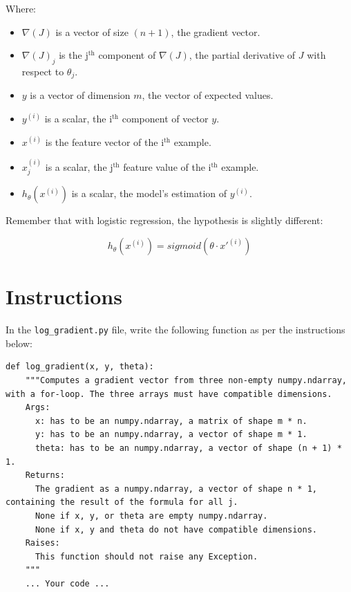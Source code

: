 \documentclass{42-en}
\begin{document}
Where:
\begin{itemize}
  \item $\nabla(J)$ is a vector of size $(n + 1)$, the gradient vector.
  \item $\nabla(J)_j$ is the j$^\text{th}$ component of $\nabla(J)$, the partial derivative of $J$ with respect to $\theta_j$.
  \item $y$ is a vector of dimension $m$, the vector of expected values.
  \item $y^{(i)}$ is a scalar, the i$^\text{th}$ component of vector $y$.
  \item $x^{(i)}$ is the feature vector of the i$^\text{th}$ example.
  \item $x^{(i)}_j$ is a scalar, the j$^\text{th}$ feature value of the i$^\text{th}$ example.
  \item $h_{\theta}(x^{(i)})$ is a scalar, the model's estimation of $y^{(i)}$.
\end{itemize}

Remember that with logistic regression, the hypothesis is slightly different:  

$$
h_{\theta}(x^{(i)}) = sigmoid( \theta \cdot x'^{(i)})
$$

\section*{Instructions}
In the \texttt{log\_gradient.py} file, write the following function as per the instructions below:

\begin{verbatim}
def log_gradient(x, y, theta):
    """Computes a gradient vector from three non-empty numpy.ndarray, with a for-loop. The three arrays must have compatible dimensions.
    Args:
      x: has to be an numpy.ndarray, a matrix of shape m * n.
      y: has to be an numpy.ndarray, a vector of shape m * 1.
      theta: has to be an numpy.ndarray, a vector of shape (n + 1) * 1.
    Returns:
      The gradient as a numpy.ndarray, a vector of shape n * 1, containing the result of the formula for all j.
      None if x, y, or theta are empty numpy.ndarray.
      None if x, y and theta do not have compatible dimensions.
    Raises:
      This function should not raise any Exception.
    """
    ... Your code ...
\end{verbatim}

\end{document}
